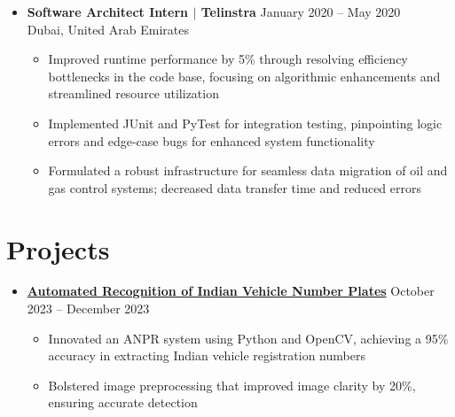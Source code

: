 \documentclass[letterpaper,11pt]{article}
\begin{document}
\begin{itemize}[leftmargin=0mm, label={}, itemsep=0pt]
  \item \vspace{-1.5pt} \textbf{Software Architect Intern $|$ Telinstra} \hfill {January 2020 -- May 2020} \\
  \small Dubai, United Arab Emirates
   \vspace{-0.30\baselineskip} %
  \begin{itemize}[leftmargin=5mm, itemsep=0pt, topsep=0pt]
    \item \small Improved runtime performance by 5\% through resolving efficiency bottlenecks in the code base, focusing on algorithmic enhancements and streamlined resource utilization
    \item \small Implemented JUnit and PyTest for integration testing,  pinpointing logic errors and edge-case bugs for enhanced system functionality
    \item \small Formulated a robust infrastructure for seamless data migration of oil and gas control systems; decreased data transfer time and reduced errors
  \end{itemize}
\end{itemize}

\vspace{-1\baselineskip} %
\vspace{-0.4\baselineskip} %

\section{Projects}
\begin{itemize}[leftmargin=0mm, label={}, itemsep=0pt]
\item \href{https://github.com/rm1738/Indian_Plate_Recognition/blob/main/annotated-DIP_Final_Report_Rahul_Menon.pdf}{\textbf{Automated Recognition of Indian Vehicle Number Plates}} \hfill {October 2023 -- December 2023} \\
\vspace{0\topsep} %
\vspace{-\partopsep} %
\vspace{-\baselineskip} %
\begin{itemize}[leftmargin=5mm, itemsep=0pt, topsep=0pt, parsep=0pt, label={\textbullet}]
  \item \small Innovated an ANPR system using Python and OpenCV, achieving a 95\% accuracy in extracting Indian vehicle registration numbers
  \item \small Bolstered image preprocessing  that improved image clarity by 20\%, ensuring accurate detection
\end{itemize}
\vspace{-\parsep} %
\end{itemize}
\end{document}
